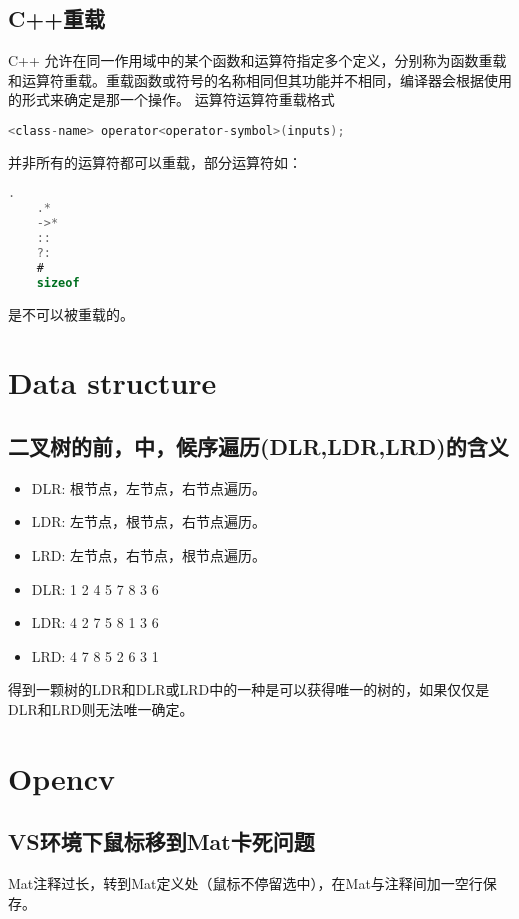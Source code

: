 \documentclass[12pt,twoside]{report}
\begin{document}
\section{C++重载}
C++ 允许在同一作用域中的某个函数和运算符指定多个定义，分别称为函数重载和运算符重载。重载函数或符号的名称相同但其功能并不相同，编译器会根据使用的形式来确定是那一个操作。
运算符运算符重载格式
\begin{lstlisting}[language=C]
    <class-name> operator<operator-symbol>(inputs);
\end{lstlisting}
并非所有的运算符都可以重载，部分运算符如：
\begin{lstlisting}[language=C]
    .
    .*
    ->*
    ::
    ?:
    #
    sizeof
\end{lstlisting}
是不可以被重载的。

\chapter{Data structure}
\section{二叉树的前，中，候序遍历(DLR,LDR,LRD)的含义}
\begin{itemize}
    \item DLR: 根节点，左节点，右节点遍历。
    \item LDR: 左节点，根节点，右节点遍历。
    \item LRD: 左节点，右节点，根节点遍历。
\end{itemize}


\begin{itemize}
    \item DLR: 1 2 4 5 7 8 3 6
    \item LDR: 4 2 7 5 8 1 3 6
    \item LRD: 4 7 8 5 2 6 3 1
\end{itemize}

得到一颗树的LDR和DLR或LRD中的一种是可以获得唯一的树的，如果仅仅是DLR和LRD则无法唯一确定。

\chapter{Opencv}
\section{VS环境下鼠标移到Mat卡死问题}
Mat注释过长，转到Mat定义处（鼠标不停留选中），在Mat与注释间加一空行保存。
\end{document}
